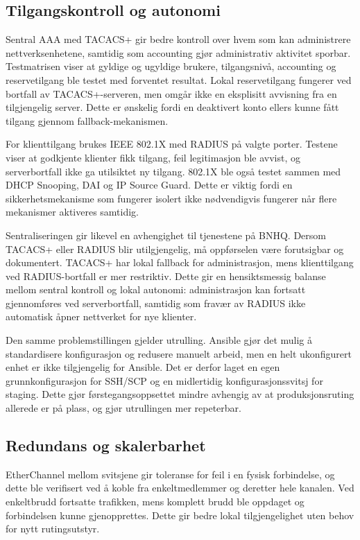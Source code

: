 \subsection{Tilgangskontroll og autonomi}

Sentral AAA med TACACS+ gir bedre kontroll over hvem som kan administrere nettverksenhetene, samtidig som accounting gjør administrativ aktivitet sporbar. Testmatrisen viser at gyldige og ugyldige brukere, tilgangsnivå, accounting og reservetilgang ble testet med forventet resultat. Lokal reservetilgang fungerer ved bortfall av TACACS+-serveren, men omgår ikke en eksplisitt avvisning fra en tilgjengelig server. Dette er ønskelig fordi en deaktivert konto ellers kunne fått tilgang gjennom fallback-mekanismen.

For klienttilgang brukes IEEE 802.1X med RADIUS på valgte porter. Testene viser at godkjente klienter fikk tilgang, feil legitimasjon ble avvist, og serverbortfall ikke ga utilsiktet ny tilgang. 802.1X ble også testet sammen med DHCP Snooping, DAI og IP Source Guard. Dette er viktig fordi en sikkerhetsmekanisme som fungerer isolert ikke nødvendigvis fungerer når flere mekanismer aktiveres samtidig.

Sentraliseringen gir likevel en avhengighet til tjenestene på BNHQ. Dersom TACACS+ eller RADIUS blir utilgjengelig, må oppførselen være forutsigbar og dokumentert. TACACS+ har lokal fallback for administrasjon, mens klienttilgang ved RADIUS-bortfall er mer restriktiv. Dette gir en hensiktsmessig balanse mellom sentral kontroll og lokal autonomi: administrasjon kan fortsatt gjennomføres ved serverbortfall, samtidig som fravær av RADIUS ikke automatisk åpner nettverket for nye klienter.

Den samme problemstillingen gjelder utrulling. Ansible gjør det mulig å standardisere konfigurasjon og redusere manuelt arbeid, men en helt ukonfigurert enhet er ikke tilgjengelig for Ansible. Det er derfor laget en egen grunnkonfigurasjon for SSH/SCP og en midlertidig konfigurasjonssvitsj for staging. Dette gjør førstegangsoppsettet mindre avhengig av at produksjonsruting allerede er på plass, og gjør utrullingen mer repeterbar.

\subsection{Redundans og skalerbarhet}

EtherChannel mellom svitsjene gir toleranse for feil i en fysisk forbindelse, og dette ble verifisert ved å koble fra enkeltmedlemmer og deretter hele kanalen. Ved enkeltbrudd fortsatte trafikken, mens komplett brudd ble oppdaget og forbindelsen kunne gjenopprettes. Dette gir bedre lokal tilgjengelighet uten behov for nytt rutingsutstyr.

